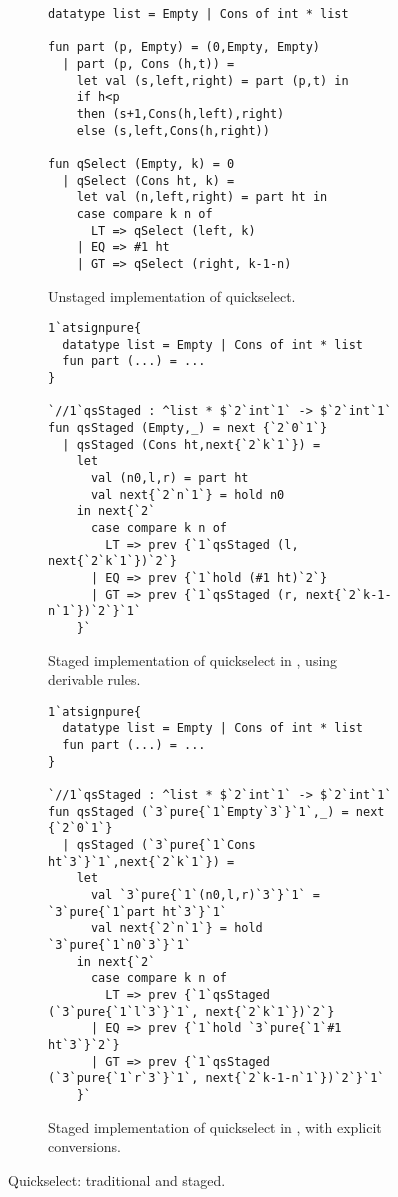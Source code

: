 
\begin{figure*}
\begin{subfigure}{0.5\textwidth}
\begin{lstlisting} 
datatype list = Empty | Cons of int * list

fun part (p, Empty) = (0,Empty, Empty) 
  | part (p, Cons (h,t)) = 
    let val (s,left,right) = part (p,t) in 
    if h<p 
    then (s+1,Cons(h,left),right) 
    else (s,left,Cons(h,right))

fun qSelect (Empty, k) = 0
  | qSelect (Cons ht, k) =
    let val (n,left,right) = part ht in
    case compare k n of
      LT => qSelect (left, k)
    | EQ => #1 ht
    | GT => qSelect (right, k-1-n)
\end{lstlisting}
\caption{Unstaged implementation of quickselect.}
\label{fig:qs-unstaged}
\end{subfigure}%
\begin{subfigure}{0.5\textwidth}
\begin{lstlisting} 
1`atsignpure{
  datatype list = Empty | Cons of int * list
  fun part (...) = ...
} 

`//1`qsStaged : ^list * $`2`int`1` -> $`2`int`1`
fun qsStaged (Empty,_) = next {`2`0`1`}
  | qsStaged (Cons ht,next{`2`k`1`}) = 
    let 
      val (n0,l,r) = part ht
      val next{`2`n`1`} = hold n0 
    in next{`2`
      case compare k n of
        LT => prev {`1`qsStaged (l, next{`2`k`1`})`2`}
      | EQ => prev {`1`hold (#1 ht)`2`}
      | GT => prev {`1`qsStaged (r, next{`2`k-1-n`1`})`2`}`1`
    }`
\end{lstlisting}
\caption{Staged implementation of quickselect in \lang, using derivable rules.}
\vspace{1.3em}
\label{fig:qs-staged}
\end{subfigure}
\begin{subfigure}{0.5\textwidth}
\begin{lstlisting} 
1`atsignpure{
  datatype list = Empty | Cons of int * list
  fun part (...) = ...
} 

`//1`qsStaged : ^list * $`2`int`1` -> $`2`int`1`
fun qsStaged (`3`pure{`1`Empty`3`}`1`,_) = next {`2`0`1`}
  | qsStaged (`3`pure{`1`Cons ht`3`}`1`,next{`2`k`1`}) = 
    let 
      val `3`pure{`1`(n0,l,r)`3`}`1` = `3`pure{`1`part ht`3`}`1`
      val next{`2`n`1`} = hold `3`pure{`1`n0`3`}`1`
    in next{`2`
      case compare k n of
        LT => prev {`1`qsStaged (`3`pure{`1`l`3`}`1`, next{`2`k`1`})`2`}
      | EQ => prev {`1`hold `3`pure{`1`#1 ht`3`}`2`}
      | GT => prev {`1`qsStaged (`3`pure{`1`r`3`}`1`, next{`2`k-1-n`1`})`2`}`1`
    }`
\end{lstlisting}
\caption{Staged implementation of quickselect in \lang, with explicit conversions.}
\vspace{1.3em}
\label{fig:qs-staged}
\end{subfigure}
\caption{Quickselect: traditional and staged.}
\end{figure*}


